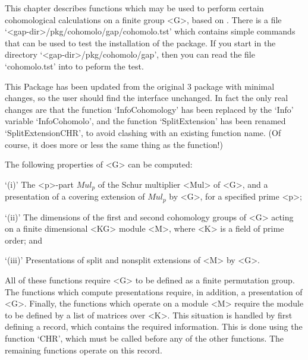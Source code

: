 


This chapter describes functions which may be used to perform certain
cohomological calculations on a finite group <G>, based on \cite{Holt85}.
There is a file `<gap-dir>/pkg/cohomolo/gap/cohomolo.tst' which contains
simple commands that can be used to test the installation of the package.
If you start {\GAP} in the directory `<gap-dir>/pkg/cohomolo/gap', then
you can read the file `cohomolo.tst' into {\GAP} to peform the test. 

This Package has been updated from the original {\GAP}3 package
with minimal changes, so the user should find the interface unchanged.
In fact the only real changes are that the function `InfoCohomology' has been
replaced by the `Info' variable `InfoCohomolo', and the function
`SplitExtension' has been renamed `SplitExtensionCHR', to avoid clashing
with an existing {\GAP} function name. (Of course, it does more or less
the same thing as the {\GAP} function!)

The following properties of <G> can be computed:

\beginitems
`(i)' The <p>-part $Mul_p$ of the Schur multiplier <Mul> of <G>,
and a presentation
of a covering extension of $Mul_p$ by <G>, for a specified prime <p>;

`(ii)' The dimensions of the first and second cohomology groups of <G>
acting on a finite dimensional <KG> module <M>, where <K> is a field of prime
order; and

`(iii)' Presentations of split and nonsplit extensions of <M> by <G>.
\enditems

All of these functions require <G> to be defined as a finite permutation
group. The functions which compute presentations require, in addition, a
presentation of <G>. Finally, the functions which operate on a module <M>
require the module to be defined by a list of matrices over <K>. This
situation is handled by first defining a {\GAP} record, which contains the
required information. This is done using the function `CHR', which must be
called before any of the other functions. The remaining functions operate
on this record.


